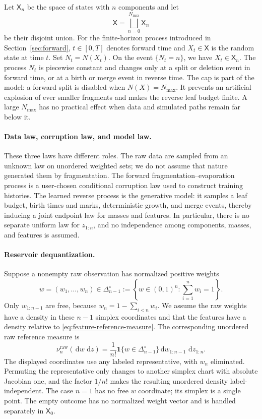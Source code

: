 \documentclass[10pt]{article}
\theoremstyle{definition}
\theoremstyle{remark}
\newcommand{\dd}{\,\mathrm{d}}
\newcommand{\ind}{\mathbf{1}}
\newcommand{\state}{\mathsf{X}}
\begin{document}
Let $\state_n$ be the space of states with $n$ components and let
\begin{equation}
  \state=\bigsqcup_{n=0}^{N_{\max}}\state_n
  \label{eq:disjoint-union}
\end{equation}
be their disjoint union.  For the finite-horizon process introduced in
Section~\ref{sec:forward}, $t\in[0,T]$ denotes forward time and
$X_t\in\state$ is the random state at time $t$.  Set
$N_t=N(X_t)$.  On the event $\{N_t=n\}$, we have $X_t\in\state_n$.
The process $N_t$ is piecewise constant and changes only at a split or
deletion event in forward time, or at a birth or merge event in reverse
time.  The cap is part of the model: a forward split is
disabled when $N(X)=N_{\max}$.  It prevents an artificial explosion of
ever smaller fragments and makes the reverse leaf budget finite.  A large
$N_{\max}$ has no practical effect when data and simulated paths remain far
below it.

\paragraph{Data law, corruption law, and model law.}
These three laws have different roles.  The raw data are sampled from an
unknown law on unordered weighted sets; we do not assume that nature
generated them by fragmentation.  The forward fragmentation--evaporation
process is a user-chosen conditional corruption law used to construct
training histories.  The learned reverse process is the generative model:
it samples a leaf budget, birth times and marks, deterministic growth, and
merge events, thereby inducing a joint endpoint law for masses and
features.  In particular, there is no separate uniform law for $z_{1:n}$,
and no independence among components, masses, and features is assumed.

\paragraph{Reservoir dequantization.}
Suppose a nonempty raw observation has normalized positive weights
\begin{equation}
  w=(w_1,\ldots,w_n)\in\Delta_{n-1}^{\circ}
  :=\left\{w\in(0,1)^n:\sum_{i=1}^n w_i=1\right\}.
  \label{eq:open-simplex}
\end{equation}
Only $w_{1:n-1}$ are free, because
$w_n=1-\sum_{i<n}w_i$.  We assume the raw weights have a density in these
$n-1$ simplex coordinates and that the features have a density relative to
\eqref{eq:feature-reference-measure}.  The corresponding unordered raw
reference measure is
\begin{equation}
  \nu_n^{\mathrm{raw}}(\dd w\,\dd z)
  =\frac{1}{n!}\ind\{w\in\Delta_{n-1}^{\circ}\}
   \dd w_{1:n-1}\,\dd z_{1:n}.
  \label{eq:raw-reference-measure}
\end{equation}
The displayed coordinates use any labeled representative, with $w_n$
eliminated.  Permuting the representative only changes to another simplex
chart with absolute Jacobian one, and the factor $1/n!$ makes the resulting
unordered density label-independent.  The case $n=1$ has no free $w$
coordinate; its simplex is a single point.  The empty outcome has no
normalized weight vector and is handled separately in $\state_0$.
\end{document}
